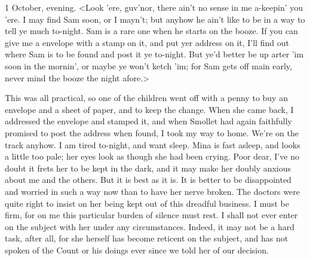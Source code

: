 \begin{diary}{1 October, evening.}
<Look 'ere, guv'nor, there ain't no sense in me a-keepin' you 'ere. I may find Sam soon, or I mayn't; but anyhow he ain't like to be in a way to tell ye much to-night. Sam is a rare one when he starts on the booze. If you can give me a envelope with a stamp on it, and put yer address on it, I'll find out where Sam is to be found and post it ye to-night. But ye'd better be up arter 'im soon in the mornin', or maybe ye won't ketch 'im; for Sam gets off main early, never mind the booze the night afore.>

This was all practical, so one of the children went off with a penny to buy an envelope and a sheet of paper, and to keep the change. When she came back, I addressed the envelope and stamped it, and when Smollet had again faithfully promised to post the address when found, I took my way to home. We're on the track anyhow. I am tired to-night, and want sleep. Mina is fast asleep, and looks a little too pale; her eyes look as though she had been crying. Poor dear, I've no doubt it frets her to be kept in the dark, and it may make her doubly anxious about me and the others. But it is best as it is. It is better to be disappointed and worried in such a way now than to have her nerve broken. The doctors were quite right to insist on her being kept out of this dreadful business. I must be firm, for on me this particular burden of silence must rest. I shall not ever enter on the subject with her under any circumstances. Indeed, it may not be a hard task, after all, for she herself has become reticent on the subject, and has not spoken of the Count or his doings ever since we told her of our decision.
\end{diary}
 
